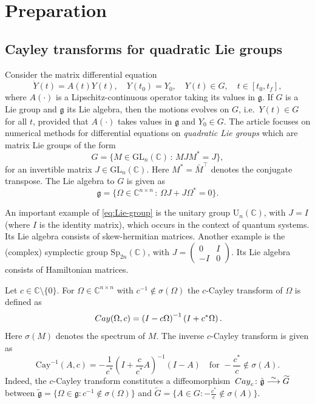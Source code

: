 \documentclass{article}
\newcommand{\Cay}{\,{\rm Cay}}
\newcommand{\C}{\mathbb{C}}
\newcommand{\Om}{\Omega}
\begin{document}
{%
\section{Preparation}
\label{sec:Cayley-transform}
%
\subsection{Cayley transforms for quadratic Lie groups}
%
%
Consider the matrix differential equation
%
\begin{equation}
\label{eq:initial_system}
\dot{Y}(t) = A(t)Y(t), \quad Y(t_0) = Y_0, \quad Y(t) \in G, \quad t \in [t_0, t_f],
\end{equation}
%
where $A(\cdot)$ is a Lipschitz-continuous operator taking its values in $\mathfrak g$.
If $G$ is a Lie group and $\mathfrak g$ its Lie algebra, then the motions evolves on $G$, i.e.\ $Y(t) \in G$ for all $t$, provided that $A(\cdot)$ takes values in $\mathfrak g$ and $Y_0 \in G$. 
The article focuses on numerical methods for differential equations on {\em quadratic Lie groups} which are matrix Lie groups of the form
%
\begin{equation}
\label{eq:Lie-group}
G = \{M \in \mathrm{GL}_n(\C) \, : \, MJM^* = J\},
\end{equation}
for an invertible matrix $J \in \mathrm{GL}_n(\C)$. Here $M^* = \bar{M}^\top$ denotes the conjugate transpose.
The Lie algebra to $G$ is given as
\[
\mathfrak g = \{ \Omega \in \C^{n \times n} \, : \, \Omega J + J \Omega^\ast =0 \}.
\]

An important example of \eqref{eq:Lie-group} is the unitary group $\mathrm{U}_n(\C)$, with $J = I$ (where $I$ is the identity matrix), which occurs in the context of quantum systems. Its Lie algebra consists of skew-hermitian matrices. Another example is the (complex) symplectic group $\mathrm{Sp}_{2n}(\C)$, with $J=\begin{pmatrix}
0 & I \\
-I & 0
\end{pmatrix}$. Its Lie algebra consists of Hamiltonian matrices. 

Let $c \in \C \setminus \{0\}$. For $\Om \in \C^{n \times n}$ with $c^{-1} \notin \sigma(\Om)$ the $c$-Cayley transform of $\Om$ is defined as
%
\[
\Cay(\Om, c) = \left(I - c \Om\right)^{-1}  \left(I + c^\ast \Om \right).
\]
%
Here $\sigma(M)$ denotes the spectrum of $M$. 
The inverse $c$-Cayley transform is given as
\[
\mathrm{Cay}^{-1}(A,c) = -\frac 1 {c^\ast} \left(I+\frac{c}{c^\ast}A\right)^{-1}(I-A) \quad \text{for } -\frac{c^\ast}{c} \not \in \sigma(A).
\]
Indeed, the $c$-Cayley transform constitutes a diffeomorphism $\Cay_{c} \colon \tilde{\mathfrak g} \stackrel{\sim}{\longrightarrow} \widetilde G$
between $\tilde{\mathfrak g} = \{ \Omega \in \mathfrak g  : c^{-1} \notin \sigma(\Omega) \}$ and $\widetilde G =  \{ A \in G : -\frac{c^\ast}{c} \notin \sigma (A) \}$. 

}
\end{document}
